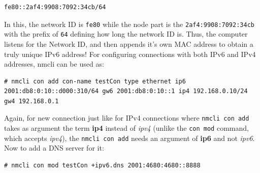 \vspace{-15pt}
\begin{verbatim}
fe80::2af4:9908:7092:34cb/64
\end{verbatim}
\vspace{-10pt}	

\noindent
In this, the network ID is \verb|fe80| while the node part is the \verb|2af4:9908:7092:34cb| with the prefix of \verb|64| defining how long the network ID is. Thus, the computer listens for the Network ID, and then appends it's own MAC address to obtain a truly unique IPv6 address! For configuring connections with both IPv6 and IPv4 addresses, nmcli can be used as:

\vspace{-15pt}
\begin{verbatim}
# nmcli con add con-name testCon type ethernet ip6 2001:db8:0:10::d000:310/64 gw6 2001:db8:0:10::1 ip4 192.168.0.10/24 gw4 192.168.0.1
\end{verbatim}
\vspace{-10pt}	

\noindent
Again, for new connection just like for IPv4 connections where \verb|nmcli con add| takes as argument the term \textbf{ip4} instead of \textit{ipv4} (unlike the \verb|con mod| command, which accepts \textit{ipv4}), the \verb|nmcli con add| needs an argument of \textbf{ip6} and not \textit{ipv6}. Now to add a DNS server for it:

\vspace{-15pt}
\begin{verbatim}
# nmcli con mod testCon +ipv6.dns 2001:4680:4680::8888
\end{verbatim}
\vspace{-10pt}